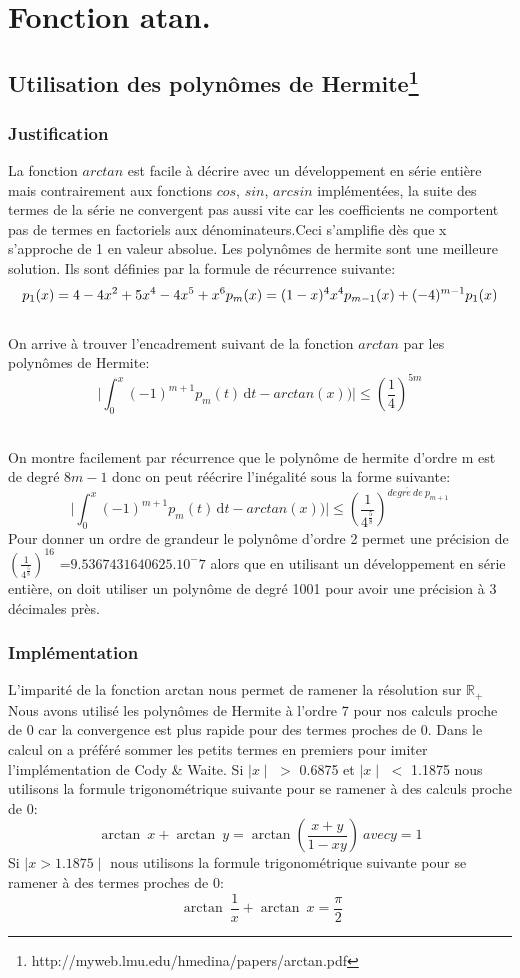 \documentclass[a4,12pt]{article}
\begin{document}
\\

\cleardoublepage
\section{Fonction atan.}
\subsection{Utilisation des polynômes de Hermite\footnote{http://myweb.lmu.edu/hmedina/papers/arctan.pdf}}
\subsubsection{Justification}
La fonction $arctan$ est facile à décrire avec un développement en série entière mais contrairement aux fonctions $cos$, $sin$, $arcsin$ implémentées, la suite des termes de la série ne convergent pas aussi vite car les coefficients ne comportent pas de termes en factoriels aux dénominateurs.Ceci s'amplifie dès que x s'approche de 1 en valeur absolue.
Les polynômes de hermite sont une meilleure solution.
Ils sont définies par la formule de récurrence suivante: 
$$
p_{1}(x)=4-4x^{2}+5x^{4}-4x^{5}+x^{6}\\
p_{m}(x)=(1-x)^{4}x^{4}p_{m-1}(x)+(-4)^{m-1}p_{1}(x)
$$
\\
On arrive à trouver l'encadrement suivant de la fonction $arctan$ par les polynômes de Hermite:
$$
\mid\int_{0}^{x} (-1)^{m+1}p_{m}(t) \, \mathrm dt - arctan(x))\mid \leq (\frac{1}{4})^{5m}
$$

\\
On montre facilement par récurrence que le polynôme de hermite d'ordre m  est de degré $8m-1$ donc on peut réécrire l'inégalité sous la forme suivante:
$$
\mid\int_{0}^{x} (-1)^{m+1}p_{m}(t) \, \mathrm dt - arctan(x))\mid \leq (\frac{1}{4^{\frac{5}{8}}})^{degr\acute e\ de\ p_{m+1}}
$$
Pour donner un ordre de grandeur le polynôme d'ordre 2 permet une précision de $(\frac{1}{4^{\frac{5}{8}}})^{16}$ =$9.5367431640625.10^-7$ alors que en utilisant un développement en série entière, on doit utiliser un polynôme de degré 1001 pour avoir une précision à 3 décimales près.

\subsubsection{Implémentation}
L'imparité de la fonction arctan nous permet de ramener la résolution sur $\mathds{R}_{+}$\\
Nous avons utilisé les polynômes de Hermite à l'ordre 7 pour nos calculs proche de 0 car la convergence est plus rapide pour des termes proches de 0.
Dans le calcul on a préféré sommer les petits termes en premiers pour imiter l'implémentation de Cody \& Waite.
Si $\mid x \mid$ $>$ 0.6875  et $\mid x \mid$ $<$ 1.1875  nous utilisons la formule trigonométrique suivante pour se ramener à des calculs proche de 0:
$$
{\arctan}~x+{\arctan}~y={\arctan}\left(\frac{x+y}{1-xy}\right)\ avec y=1
$$
Si $\mid x > 1.1875 \mid$ nous utilisons la formule trigonométrique suivante pour se ramener à des termes proches de 0:
$$
\ {\arctan}\ \frac1x+{\arctan}\ x=\frac\pi2
$$
\end{document}

